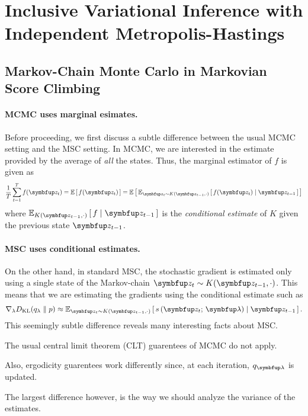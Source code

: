 
\section{Inclusive Variational Inference with Independent Metropolis-Hastings}

\subsection{Markov-Chain Monte Carlo in Markovian Score Climbing}\label{section:msc_mcmc}
\paragraph{MCMC uses marginal esimates.}
Before proceeding, we first discuss a subtle difference between the usual MCMC setting and the MSC setting.
In MCMC, we are interested in the estimate provided by the average of \textit{all} the states.
Thus, the marginal estimator of \(f\) is given as
\begin{align}
  \frac{1}{T} \sum^{T}_{t=1} f(\vz_t) = \E{f(\vz_t)} = \E{\Esub{\vz_t \sim K(\vz_{t-1},\cdot)}{ f(\vz_t) \mid \vz_{t-1}}}
\end{align}
where \(\Esub{K(\vz_{t-1},\cdot)}{ f \mid \vz_{t-1}}\) is the \textit{conditional estimate} of \(K\) given the previous state \(\vz_{t-1}\).

\paragraph{MSC uses conditional estimates.}
On the other hand, in standard MSC, the stochastic gradient is estimated only using a single state of the Markov-chain \(\vz_t \sim K(\vz_{t-1}, \cdot)\).
This means that we are estimating the gradients using the conditional estimate such as
\begin{align}
  \nabla_{\lambda} \DKL{q_{\lambda}}{p} \approx \Esub{\vz_t \sim K(\vz_{t-1},\cdot)}{s\,(\vz_t;\, \vlambda) \mid \vz_{t-1}}.
\end{align}
This seemingly subtle difference reveals many interesting facts about MSC.
\begin{enumerate*}[label=(\roman*)]
\item The usual central limit theorem (CLT) guarentees of MCMC do not apply.
\item Also, ergodicity guarentees work differently since, at each iteration, \(q_{\vlambda}\) is updated.
\end{enumerate*}
The largest difference however, is the way we should analyze the variance of the estimates.

